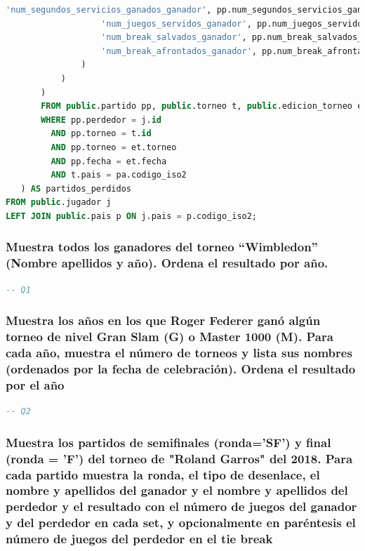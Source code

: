 \documentclass[10pt]{opticajnl}
\begin{document}
\begin{lstlisting}[language=SQL]
                   'num_segundos_servicios_ganados_ganador', pp.num_segundos_servicios_ganados_ganador,
                   'num_juegos_servidos_ganador', pp.num_juegos_servidos_ganador,
                   'num_break_salvados_ganador', pp.num_break_salvados_ganador,
                   'num_break_afrontados_ganador', pp.num_break_afrontados_ganador
               )
           )
       )
       FROM public.partido pp, public.torneo t, public.edicion_torneo et, public.pais pa
       WHERE pp.perdedor = j.id
         AND pp.torneo = t.id
         AND pp.torneo = et.torneo
         AND pp.fecha = et.fecha
         AND t.pais = pa.codigo_iso2
   ) AS partidos_perdidos
FROM public.jugador j
LEFT JOIN public.pais p ON j.pais = p.codigo_iso2;
\end{lstlisting}





\subsubsection{Muestra todos los ganadores del torneo ``Wimbledon'' (Nombre apellidos y año). Ordena el resultado por año.}

\begin{lstlisting}[language=SQL]
-- Q1
\end{lstlisting}





\subsubsection{Muestra los años en los que Roger Federer ganó algún torneo de nivel Gran Slam (G) o Master 1000 (M). Para cada año, muestra el número de torneos y lista sus nombres (ordenados por la fecha de celebración). Ordena el resultado por el año}

\begin{lstlisting}[language=SQL]
-- Q2
\end{lstlisting}





\subsubsection{Muestra los partidos de semiﬁnales (ronda='SF') y ﬁnal (ronda = 'F') del torneo de "Roland Garros" del 2018. Para cada partido muestra la ronda, el tipo de desenlace, el nombre y apellidos del ganador y el nombre y apellidos del perdedor y el resultado con el número de juegos del ganador y del perdedor en cada set, y opcionalmente en paréntesis el número de juegos del perdedor en el tie break}
\end{document}
